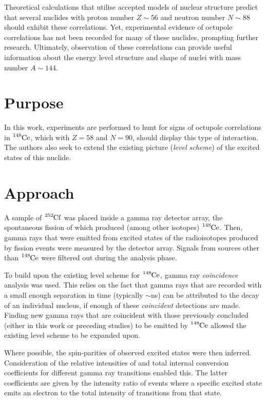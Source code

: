 \documentclass[12pt,a4paper]{article}
\begin{document}
\medskip
Theoretical calculations that utilise accepted models of nuclear structure predict that several nuclides with proton number $Z \sim 56$ and neutron number $N \sim 88$ should exhibit these correlations.
Yet, experimental evidence of octupole correlations has not been recorded for many of these nuclides, prompting further research.
Ultimately, observation of these correlations can provide useful information about the energy level structure and shape of nuclei with mass number $A\sim144$.


\section*{Purpose}
In this work, experiments are performed to hunt for signs of octupole correlations in $\ce{^{148}Ce}$, which with $Z = 58$ and $N = 90$, should display this type of interaction. The authors also seek to extend the existing picture (\textit{level scheme}) of the excited states of this nuclide.


\section*{Approach}
A sample of $\ce{^{252}Cf}$ was placed inside a gamma ray detector array, the spontaneous fission of which produced (among other isotopes) $\ce{^{148}Ce}$.
Then, gamma rays that were emitted from excited states of the radioisotopes produced by fission events were measured by the detector array.
Signals from sources other than $\ce{^{148}Ce}$ were filtered out during the analysis phase.

\medskip
To build upon the existing level scheme for $\ce{^{148}Ce}$, gamma ray \textit{coincidence} analysis was used.
This relies on the fact that gamma rays that are recorded with a small enough separation in time (typically $\sim$ns) can be attributed to the decay of an individual nucleus, if enough of these \textit{coincident} detections are made.
Finding new gamma rays that are coincident with those previously concluded (either in this work or preceding studies) to be emitted by $\ce{^{148}Ce}$ allowed the existing level scheme to be expanded upon.

\medskip
Where possible, the spin-parities of observed excited states were then inferred. Consideration of the relative intensities of and total internal conversion coefficients for different gamma ray transitions enabled this. The latter coefficients are given by the intensity ratio of events where a specific excited state emits an electron to the total intensity of transitions from that state.
\end{document}
